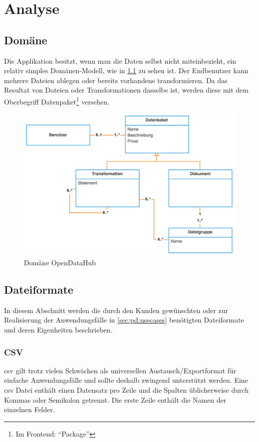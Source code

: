 \chapter{Analyse}


\section{Domäne}

Die Applikation besitzt, wenn man die Daten selbst nicht miteinbezieht, ein relativ simples Domänen-Modell, wie in \cref{fig:pd:domain-model} zu sehen ist. Der Endbenutzer kann mehrere Dateien ablegen oder bereits vorhandene transformieren. Da das Resultat von Dateien oder Transformationen dasselbe ist, werden diese mit dem Oberbegriff Datenpaket\footnote{Im Frontend: ``Package''} versehen.

\begin{figure}[H]
    \centering
    \includegraphics[width=0.8\linewidth]{fig/domain-model.pdf}
    \caption{Domäne OpenDataHub}
    \label{fig:pd:domain-model}
\end{figure}

\section{Dateiformate}

In diesem Abschnitt werden die durch den Kunden gewünschten oder zur Realisierung der Anwendungsfälle in \cref{sec:pd:usecases} benötigten Dateiformate und deren Eigenheiten beschrieben.

\subsection{CSV}
\acf{csv} gilt trotz vielen Schwächen als universellen Austausch/Exportformat für einfache Anwendungsfälle und sollte deshalb zwingend unterstützt werden. Eine \acs{csv} Datei enthält einen Datensatz pro Zeile und die Spalten üblicherweise durch Kommas oder Semikolon getrennt. Die erste Zeile enthält die Namen der einzelnen Felder.

